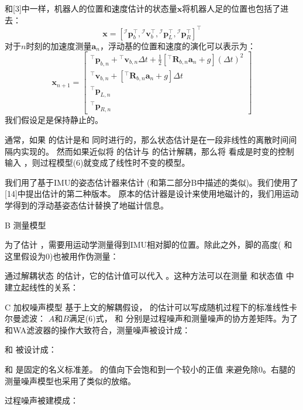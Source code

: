 和[3]中一样，机器人的位置和速度估计的状态量$\boldsymbol{x}$将机器人足的位置也包括了进去：
\begin{equation}
    \label{equ:est_posvel}
    \boldsymbol{x}=\left[{ }^\mathcal{I} \boldsymbol{p}_b^{\top},{ }^\mathcal{I} \boldsymbol{v}_b^{\top},{ }^\mathcal{I} \boldsymbol{p}_L^{\top},{ }^\mathcal{I} \boldsymbol{p}_R^{\top}\right]^{\top}
\end{equation}
对于$n$时刻的加速度测量$\boldsymbol{a}_n$，浮动基的位置和速度的演化可以表示为：
\begin{equation}
    \label{equ:est_posvel}
    \boldsymbol{x}_{n+1}=\left[\begin{array}{c}
        { }^{\top} \boldsymbol{p}_{b, n}+{ }^{\top} \boldsymbol{v}_{b, n} \Delta t+\frac{1}{2}\left[{ }^{\top} \boldsymbol{R}_{b, n} \boldsymbol{a}_n+g\right](\Delta t)^2 \\
        { }^{\top} \boldsymbol{v}_{b, n}+\left[{ }^{\top} \boldsymbol{R}_{b, n} \boldsymbol{a}_n+g\right] \Delta t \\
        { }^{\top} \boldsymbol{p}_{L, n} \\
        { }^{\top} \boldsymbol{p}_{R, n}
        \end{array}\right]
\end{equation}
我们假设足是保持静止的。

通常，如果 的估计是和 同时进行的，那么状态估计是在一段非线性的离散时间间隔内实现的。
然而如果近似将 的估计与 的估计解耦，那么将 看成是时变的控制输入 ，则过程模型(6)就变成了线性时不变的模型。

我们用了基于IMU的姿态估计器来估计 (和第二部分B中描述的类似)。我们使用了[14]中提出估计的第二种版本。
原本的估计器是设计来使用地磁计的，我们用运动学得到的浮动基姿态估计替换了地磁计信息。

B 测量模型

为了估计 ，需要用运动学测量得到IMU相对脚的位置。除此之外，脚的高度( 和 这里假设为0)也被用作伪测量：

通过解耦状态 的估计，它的估计值可以代入 。这种方法可以在测量 和状态值 中建立起线性的关系：

C 加权噪声模型
基于上文的解耦假设， 的估计可以写成随机过程下的标准线性卡尔曼滤波：
$A$和$B$满足(6)式， 和 分别是过程噪声和测量噪声的协方差矩阵。为了和WA滤波器的操作大致符合，测量噪声被设计成：

和 被设计成：

和 是固定的名义标准差。 的值向下会饱和到一个较小的正值 来避免除0。右腿的测量噪声模型也采用了类似的放缩。

过程噪声被建模成：

